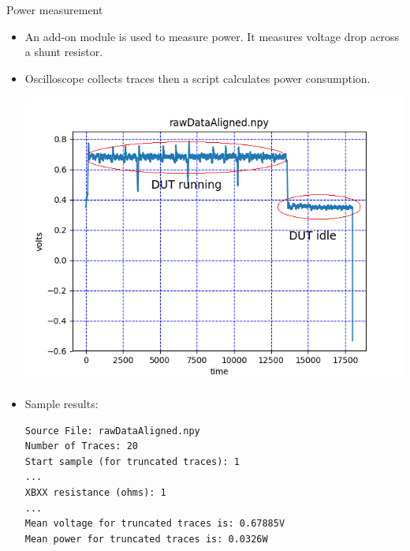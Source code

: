 \documentclass[xcolor=pdftex,dvipsnames,table,final]{beamer}
\begin{document}
\begin{frame}[fragile]{}
\begin{columns}[t]
\begin{column}{.31\linewidth}
      \begin{block}{Power measurement}
         \vspace{-1ex}
         \begin{itemize}
          \item An add-on module is used to measure power. It measures voltage drop across a shunt resistor.
          \item Oscilloscope collects traces then a script calculates power consumption.
        \begin{center}
          \includegraphics[scale=0.8]{images/power.png}
        \end{center}
        \item Sample results:


\begin{Verbatim}[fontsize=\small]
Source File: rawDataAligned.npy
Number of Traces: 20
Start sample (for truncated traces): 1
...
XBXX resistance (ohms): 1
...
Mean voltage for truncated traces is: 0.67885V
Mean power for truncated traces is: 0.0326W
\end{Verbatim}
         \end{itemize}



\end{block}
\end{column}
\end{columns}
\end{frame}
\end{document}
